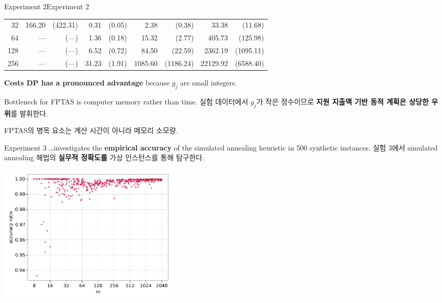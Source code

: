 \documentclass[11pt,mathserif,notheorems]{beamer}
\theoremstyle{definition}
\theoremstyle{definition}
\begin{document}
\begin{frame}{\ifen Experiment 2\else Experiment 2\fi}
\begin{center}
{\begin{tabular}{r|r@{~}r|r@{~}r|r@{~}r|r@{~}r}
    32 &        166.20 &     (422.31) &         0.31 &      (0.05) &                2.38 &             (0.38) &                33.38 &             (11.68) \\
    64 &             — &          (—) &         1.36 &      (0.18) &               15.32 &             (2.77) &               405.73 &            (125.98) \\
   128 &             — &          (—) &         6.52 &      (0.72) &               84.50 &            (22.59) &              2362.19 &           (1095.11) \\
   256 &             — &          (—) &        31.23 &      (1.91) &             1085.60 &          (1186.24) &             22129.92 &           (6588.40)
\end{tabular}
}
\end{center}
\ifen 
\textbf{Costs DP has a pronounced advantage} because $g_j$ are small integers.

Bottleneck for FPTAS is computer memory rather than time. 
\else
실험 데이터에서 $g_j$가 작은 정수이므로 \textbf{지원 지출액 기반 동적 계획은 상당한 우위}를 발휘한다. 

FPTAS의 병목 요소는 계산 시간이 아니라 메모리 소모량.
\fi

\end{frame}





\begin{frame}{Experiment 3}
\ifen
\dots investigates the \textbf{empirical accuracy} of the simulated annealing heuristic in 500 synthetic instances.
\else
실험 3에서 simulated annealing 해법의 \textbf{실무적 정확도를} 가상 인스턴스를 통해 탐구한다.
\fi
\begin{center}
 \includegraphics[height=18em]{./plots/accuracy_simulatedannealing.pdf}
\end{center}
\end{frame}
\end{document}
